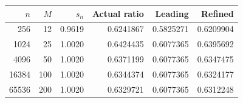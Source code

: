 \begin{tabular}{rrrrrr}
\toprule
$n$ & $M$ & $s_n$ & Actual ratio & Leading & Refined \\
\midrule
256 & 12 & 0.9619 & 0.6241867 & 0.5825271 & 0.6209904 \\
1024 & 25 & 1.0020 & 0.6424435 & 0.6077365 & 0.6395692 \\
4096 & 50 & 1.0020 & 0.6371199 & 0.6077365 & 0.6347475 \\
16384 & 100 & 1.0020 & 0.6344374 & 0.6077365 & 0.6324177 \\
65536 & 200 & 1.0020 & 0.6329721 & 0.6077365 & 0.6312248 \\
\bottomrule
\end{tabular}
